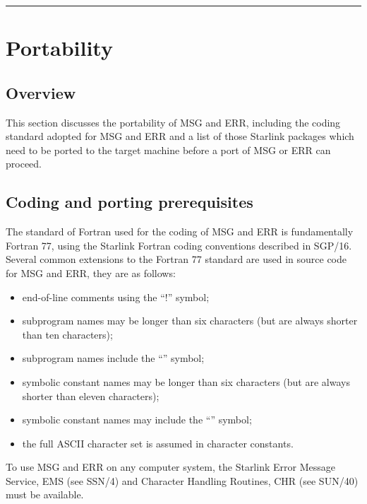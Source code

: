 \documentclass[twoside,11pt]{article}
\newcommand{\latex}[1]{#1}
\newcommand{\xref}[3]{#1}
\newcommand{\xlabel}[1]{}
\renewcommand{\_}{\texttt{\symbol{95}}}
\begin{document}
\rule{\textwidth}{0.5mm}
\normalsize
\newpage
\section{\xlabel{portability}Portability}

\subsection{\xlabel{overview}Overview}

This section discusses the portability of MSG and ERR, including the coding 
standard adopted for MSG and ERR and a list of those Starlink packages which 
need to be ported to the target machine before a port of MSG or ERR can proceed.


\subsection{\xlabel{coding_and_porting_prerequisites}Coding and porting prerequisites}

The standard of Fortran used for the coding of MSG and ERR is fundamentally
Fortran 77, using the Starlink Fortran coding conventions described in 
\xref{SGP/16}{sgp16}{}.
Several common extensions to the Fortran 77 standard are used in source 
code for MSG and ERR, they are as follows:

\begin {itemize}
\item end-of-line comments using the ``!'' symbol;
\item subprogram names may be longer than six characters (but are 
always shorter than ten characters);
\item subprogram names include the ``\_'' symbol;
\item symbolic constant names may be longer than six characters (but are always
shorter than eleven characters);
\item symbolic constant names may include the ``\_'' symbol;
\item the full ASCII character set is assumed in character constants.
\end {itemize}

To use MSG and ERR on any computer system, the Starlink Error Message Service,
\xref{EMS}{ssn4}{abstract} \latex{(see SSN/4)}
and Character Handling Routines, 
\xref{CHR}{sun40}{abstract} \latex{(see SUN/40)}
must be available.
\end{document}
